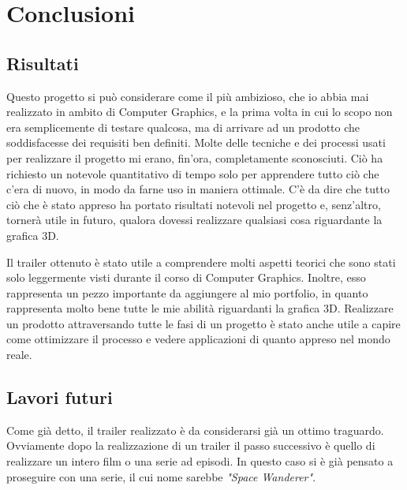 
\chapter{Conclusioni} %

\label{Chapter6} %


\section{Risultati}
Questo progetto si può considerare come il più ambizioso, che io abbia mai realizzato in ambito di Computer Graphics, e la prima volta in cui lo scopo non era semplicemente di testare qualcosa, ma di arrivare ad un prodotto che soddisfacesse dei requisiti ben definiti.
Molte delle tecniche e dei processi usati per realizzare il progetto mi erano, fin'ora, completamente sconosciuti.
Ciò ha richiesto un notevole quantitativo di tempo solo per apprendere tutto ciò che c'era di nuovo, in modo da farne uso in maniera ottimale.
C'è da dire che tutto ciò che è stato appreso ha portato risultati notevoli nel progetto e, senz'altro, tornerà utile in futuro, qualora dovessi realizzare qualsiasi cosa riguardante la grafica 3D.

Il trailer ottenuto è stato utile a comprendere molti aspetti teorici che sono stati solo leggermente visti durante il corso di Computer Graphics.
Inoltre, esso rappresenta un pezzo importante da aggiungere al mio portfolio, in quanto rappresenta molto bene tutte le mie abilità riguardanti la grafica 3D.
Realizzare un prodotto attraversando tutte le fasi di un progetto è stato anche utile a capire come ottimizzare il processo e vedere applicazioni di quanto appreso nel mondo reale.

\newpage
\section{Lavori futuri}

Come già detto, il trailer realizzato è da considerarsi già un ottimo traguardo. Ovviamente dopo la realizzazione di un trailer il passo successivo è quello di realizzare un intero film o una serie ad episodi.
In questo caso si è già pensato a proseguire con una serie, il cui nome sarebbe \emph{"Space Wanderer"}.

